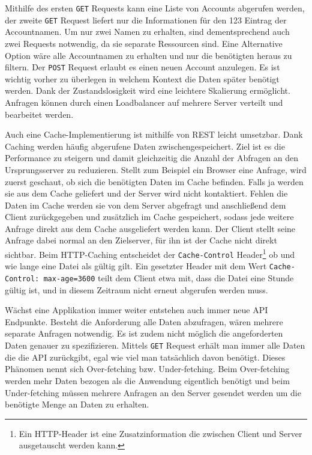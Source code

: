 Mithilfe des ersten \verb+GET+ Requests kann eine Liste von Accounts abgerufen werden, der zweite \verb+GET+ Request liefert nur die Informationen für den 123 Eintrag der Accountnamen.
Um nur zwei Namen zu erhalten, sind dementsprechend auch zwei Requests notwendig, da sie separate Ressourcen sind.
Eine Alternative Option wäre alle Accountnamen zu erhalten und nur die benötigten heraus zu filtern.
Der \verb+POST+ Request erlaubt es einen neuen Account anzulegen.
Es ist wichtig vorher zu überlegen in welchem Kontext die Daten später benötigt werden.
Dank der Zustandslosigkeit wird eine leichtere Skalierung ermöglicht.
Anfragen können durch einen Loadbalancer auf mehrere Server verteilt und bearbeitet werden.

Auch eine Cache-Implementierung ist mithilfe von REST leicht umsetzbar.
Dank Caching werden häufig abgerufene Daten zwischengespeichert.
Ziel ist es die Performance zu steigern und damit gleichzeitig die Anzahl der Abfragen an den Ursprungsserver zu reduzieren.
Stellt zum Beispiel ein Browser eine Anfrage, wird zuerst geschaut, ob sich die benötigten Daten im Cache befinden.
Falls ja werden sie aus dem Cache geliefert und der Server wird nicht kontaktiert.
Fehlen die Daten im Cache werden sie von dem Server abgefragt und anschließend dem Client zurückgegeben und zusätzlich im Cache gespeichert, sodass jede weitere Anfrage direkt aus dem Cache ausgeliefert werden kann.
Der Client stellt seine Anfrage dabei normal an den Zielserver, für ihn ist der Cache nicht direkt sichtbar.
Beim HTTP-Caching entscheidet der \verb+Cache-Control+ Header\footnote{Ein HTTP-Header ist eine Zusatzinformation die zwischen Client und Server ausgetauscht werden kann.} ob und wie lange eine Datei als gültig gilt.
Ein gesetzter Header mit dem Wert \verb+Cache-Control: max-age=3600+ teilt dem Client etwa mit, dass die Datei eine Stunde gültig ist, und in diesem Zeitraum nicht erneut abgerufen werden muss. \cite[]{Cache}

Wächst eine Applikation immer weiter entstehen auch immer neue API Endpunkte.
Besteht die Anforderung alle Daten abzufragen, wären mehrere separate Anfragen notwendig.
Es ist zudem nicht möglich die angeforderten Daten genauer zu spezifizieren.
Mittels \verb+GET+ Request erhält man immer alle Daten die die API zurückgibt, egal wie viel man tatsächlich davon benötigt.
Dieses Phänomen nennt sich Over-fetching bzw. Under-fetching.
Beim Over-fetching werden mehr Daten bezogen als die Anwendung eigentlich benötigt und beim Under-fetching müssen mehrere Anfragen an den Server gesendet werden um die benötigte Menge an Daten zu erhalten.\cite[]{API}

